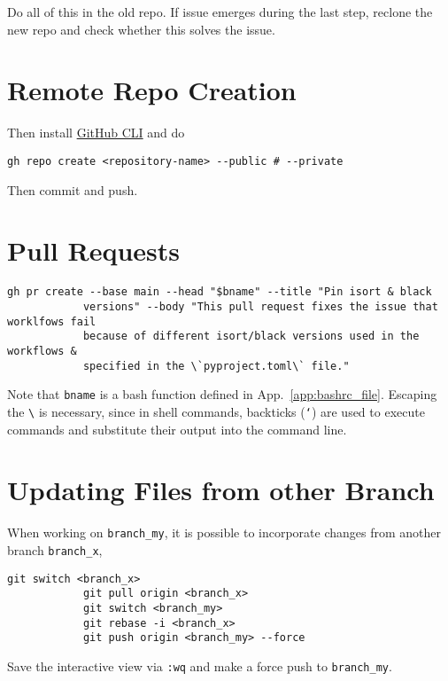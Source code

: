 \documentclass[12pt, a4paper]{scrbook}
\numberwithin{equation}{section}
\theoremstyle{definition}
\theoremstyle{definition}
\begin{document}
		Do all of this in the old repo. If issue emerges during the last step, reclone the new repo and check whether this solves the issue.
	
	\section{Remote Repo Creation}		
		Then install \href{https://cli.github.com/}{GitHub CLI} and do
		
		\begin{lstlisting}[style=mystylebash, xleftmargin=\parindent]
			gh repo create <repository-name> --public # --private
		\end{lstlisting}
		
		Then commit and push.
		
	\section{Pull Requests}
		
		\begin{lstlisting}[style=mystylebash, xleftmargin=\parindent]
			gh pr create --base main --head "$bname" --title "Pin isort & black 
			versions" --body "This pull request fixes the issue that worklfows fail
			because of different isort/black versions used in the workflows & 
			specified in the \`pyproject.toml\` file."
		\end{lstlisting}
	
		Note that \texttt{bname} is a bash function defined in App.~\ref{app:bashrc_file}. Escaping the \texttt{\textbackslash} is necessary, since in shell commands, backticks (\texttt{`}) are used to execute commands and substitute their output into the command line.
		
	\section{Updating Files from other Branch}	
	
		When working on \texttt{branch\_my}, it is possible to incorporate changes from another branch \texttt{branch\_x}, 

		\begin{lstlisting}[style=mystylebash, xleftmargin=\parindent]
			git switch <branch_x>
			git pull origin <branch_x>
			git switch <branch_my>
			git rebase -i <branch_x>
			git push origin <branch_my> --force
		\end{lstlisting}
		
		Save the interactive view via \texttt{:wq} and make a force push to \texttt{branch\_my}. 
	
\end{document}
